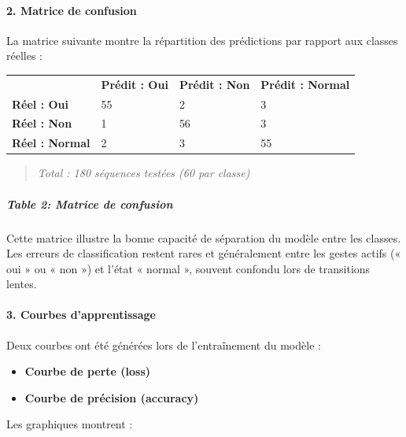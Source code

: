 \documentclass[
]{article}
\begin{document}
\hypertarget{matrice-de-confusion}{%
\paragraph{\texorpdfstring{\textbf{2. Matrice de confusion}}{2. Matrice de confusion}}\label{matrice-de-confusion}}

La matrice suivante montre la répartition des prédictions par rapport aux classes réelles :

\begin{longtable}[]{@{}llll@{}}
\toprule
\endhead
& \textbf{Prédit : Oui} & \textbf{Prédit : Non} & \textbf{Prédit : Normal} \\
\textbf{Réel : Oui} & 55 & 2 & 3 \\
\textbf{Réel : Non} & 1 & 56 & 3 \\
\textbf{Réel : Normal} & 2 & 3 & 55 \\
\bottomrule
\end{longtable}

\begin{quote}
\emph{Total : 180 séquences testées (60 par classe)}
\end{quote}

\hypertarget{table-2-matrice-de-confusion}{%
\subparagraph{Table 2: Matrice de confusion}\label{table-2-matrice-de-confusion}}

Cette matrice illustre la bonne capacité de séparation du modèle entre les classes. Les erreurs de classification restent rares et généralement entre les gestes actifs (« oui » ou « non ») et l'état « normal », souvent confondu lors de transitions lentes.

\hypertarget{courbes-dapprentissage}{%
\paragraph{\texorpdfstring{\textbf{3. Courbes d'apprentissage}}{3. Courbes d'apprentissage}}\label{courbes-dapprentissage}}

Deux courbes ont été générées lors de l'entraînement du modèle :

\begin{itemize}
\item
  \textbf{Courbe de perte (loss)\\
  }
\item
  \textbf{Courbe de précision (accuracy)\\
  }
\end{itemize}

Les graphiques montrent :
\end{document}
